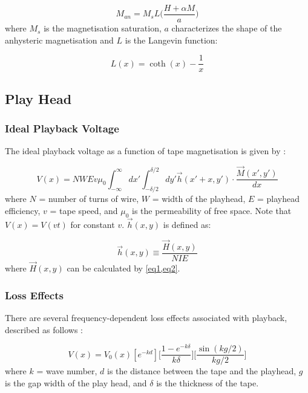 \documentclass[twoside,a4paper]{article}
\begin{document}
\begin{equation}
    M_{an} = M_s L \Big( \frac{H + \alpha M}{a} \Big)
\end{equation}
%
where $M_s$ is the magnetisation saturation, $a$ characterizes the shape
of the anhysteric magnetisation and $L$ is the Langevin function:

\begin{equation}
    L(x) = \coth (x) - \frac{1}{x}
\end{equation}

\subsection{Play Head}
\subsubsection{Ideal Playback Voltage}
The ideal playback voltage as a function of tape magnetisation is given by
\cite{1994tmr..book.....B}:

\begin{equation}
    V(x) =  NWEv \mu_0 \int_{-\infty}^{\infty} dx' \int_{-\delta/2}^{\delta/2} dy' \vec{h}(x' + x, y') \cdot \frac{\vec{M}(x', y')}{dx}
    \label{eq11}
\end{equation}
%
where $N$ = number of turns of wire, $W$ = width of the playhead, $E$ = playhead
efficiency, $v$ = tape speed, and $\mu_0$ is the permeability of free space.
Note that $V(x) = V(vt)$ for constant $v$. $\vec{h}(x, y)$ is defined as:

\begin{equation}
    \vec{h} (x, y) \equiv \frac{\vec{H} (x, y)}{NIE}
    \label{eq12}
\end{equation}
%
where $\vec{H} (x, y)$ can be calculated by \cref{eq1,eq2}.

\subsubsection{Loss Effects}
There are several frequency-dependent loss effects associated with playback,
described as follows \cite{Kadis}:

\begin{equation}
    V(x) = V_0(x) [e^{-kd}] \Big[\frac{1 - e^{-k \delta}}{k \delta} \Big] \Big[\frac{\sin (kg /2)}{kg/2} \Big]
\end{equation}
%
where $k$ = wave number, $d$ is the distance between the tape and the playhead,
$g$ is the gap width of the play head, and $\delta$ is the thickness of the tape.
\end{document}
